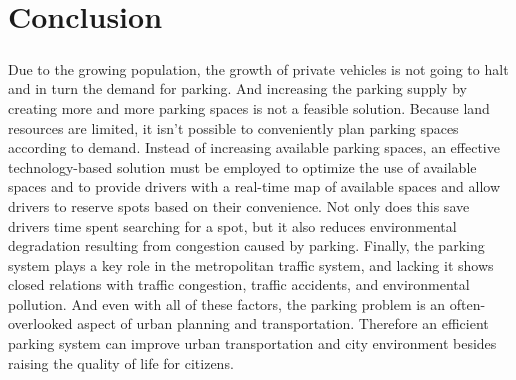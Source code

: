 \chapter{Conclusion}

    \paragraph*{}
    Due to the growing population, the growth of private vehicles is not going to halt and in turn the demand for parking. And increasing the parking supply by creating more and more parking spaces is not a feasible solution. Because land resources are limited, it isn’t possible to conveniently plan parking spaces according to demand. Instead of increasing available parking spaces, an effective technology-based solution must be employed to optimize the use of available spaces and to  provide drivers with a real-time map of available spaces and allow drivers to reserve spots based on their convenience. Not only does this save drivers time spent searching for a spot, but it also reduces environmental degradation resulting from congestion caused by parking. Finally, the parking system plays a key role in the metropolitan traffic system, and lacking it shows closed relations with traffic congestion, traffic accidents, and environmental pollution. And even with all of these factors, the parking problem is an often-overlooked aspect of urban planning and transportation. Therefore an efficient parking system can improve urban transportation and city environment besides raising the quality of life for citizens.